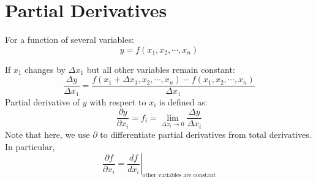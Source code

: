 \documentclass{./../Latex/handout}
\begin{document}
%
%
%
%

\section{Partial Derivatives}

For a function of several variables:
$$
y=f\left(x_{1}, x_{2}, \cdots, x_{n}\right)
$$

If $x_1$ changes by $\Delta x_1$ but all other variables remain constant: 
$$
\frac{\Delta y}{\Delta x_{1}}=\frac{f\left(x_{1}+\Delta x_1, x_{2}, \cdots, x_{n}\right)-f\left(x_{1}, x_{2}, \cdots, x_{n}\right)}{\Delta x_{1}}
$$
Partial derivative of $y$ with respect to $x_i$ is defined as:
$$
\frac{\partial y}{\partial x_{i}}= f_i = \lim _{\Delta x_{i} \rightarrow 0} \frac{\Delta y}{\Delta x_{i}}
$$
Note that here, we use $\partial$ to differentiate partial derivatives from total derivatives. In particular, 
$$\left.\frac{\partial f}{\partial x_{i}} = \frac{d f}{d x_{i}} \right\vert_{\text{other variables are constant}} $$ \\
\end{document}
